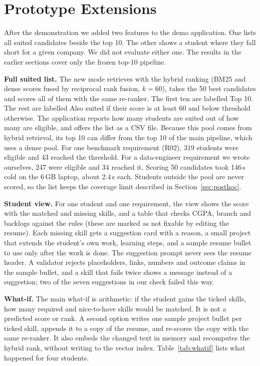 \documentclass[conference]{IEEEtran}
\begin{document}
\FloatBarrier
\section{Prototype Extensions}\label{sec:ext}
After the demonstration we added two features to the demo application. One lists all suited candidates beside the top 10. The other shows a student where they fall short for a given company. We did not evaluate either one. The results in the earlier sections cover only the frozen top-10 pipeline.

\textbf{Full suited list.} The new mode retrieves with the hybrid ranking (BM25 and dense scores fused by reciprocal rank fusion, $k=60$), takes the 50 best candidates and scores all of them with the same re-ranker. The first ten are labelled Top 10. The rest are labelled Also suited if their score is at least 60 and below threshold otherwise. The application reports how many students are suited out of how many are eligible, and offers the list as a CSV file. Because this pool comes from hybrid retrieval, its top 10 can differ from the top 10 of the main pipeline, which uses a dense pool. For one benchmark requirement (R02), 319 students were eligible and 43 reached the threshold. For a data-engineer requirement we wrote ourselves, 247 were eligible and 34 reached it. Scoring 50 candidates took 146\,s cold on the 6\,GB laptop, about 2.4\,s each. Students outside the pool are never scored, so the list keeps the coverage limit described in Section~\ref{sec:posthoc}.

\textbf{Student view.} For one student and one requirement, the view shows the score with the matched and missing skills, and a table that checks CGPA, branch and backlogs against the rules (these are marked as not fixable by editing the resume). Each missing skill gets a suggestion card with a reason, a small project that extends the student's own work, learning steps, and a sample resume bullet to use only after the work is done. The suggestion prompt never sees the resume header. A validator rejects placeholders, links, numbers and outcome claims in the sample bullet, and a skill that fails twice shows a message instead of a suggestion; two of the seven suggestions in our check failed this way.

\textbf{What-if.} The main what-if is arithmetic: if the student gains the ticked skills, how many required and nice-to-have skills would be matched. It is not a predicted score or rank. A second option writes one sample project bullet per ticked skill, appends it to a copy of the resume, and re-scores the copy with the same re-ranker. It also embeds the changed text in memory and recomputes the hybrid rank, without writing to the vector index. Table~\ref{tab:whatif} lists what happened for four students.
\end{document}
